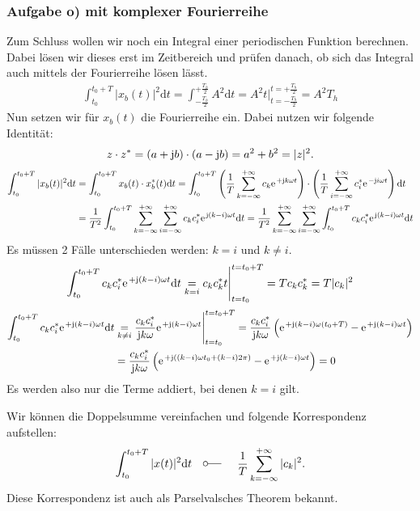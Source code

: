 \documentclass[11pt,a4paper,DIV=12]{scrartcl}
\newcommand{\diff}{\mathrm{d}}
\begin{document}
\subsubsection*{Aufgabe o) mit komplexer Fourierreihe}
%
Zum Schluss wollen wir noch ein Integral einer periodischen Funktion berechnen.
%
Dabei lösen wir dieses erst im Zeitbereich und prüfen danach, ob sich das
Integral auch mittels der Fourierreihe lösen lässt.
%
\begin{align}
	\int_{t_0}^{t_0+T}|x_b(t)|^2\diff t
	=\int_{-\frac{T_h}{2}}^{+\frac{T_h}{2}}A^2\diff t
	= A^2t\Bigg |_{t=-\frac{T_h}{2}}^{t=+\frac{T_h}{2}}=A^2T_h
\end{align}
%
Nun setzen wir für $x_b(t)$ die Fourierreihe ein.
%
Dabei nutzen wir folgende Identität:
%
\begin{align}
	z\cdot z^*=(a+\im b)\cdot (a-\im b)=a^2+b^2=|z|^2.
\end{align}
%
%
\begin{align}
	\int_{t_0}^{t_0+T}|x_b(t)|^2\diff t
	&=\int_{t_0}^{t_0+T}x_b(t)\cdot x_b^*(t)\diff t
	=\int_{t_0}^{t_0+T}\left (\frac{1}{T}\sum_{k=-\infty}^{+\infty}c_k\e^{+\im k \omega t}\right )\cdot \left (\frac{1}{T}\sum_{i=-\infty}^{+\infty}c_i^*\e^{-\im i \omega t}\right )\diff t\nonumber \\
	&=\frac{1}{T^2}\int_{t_0}^{t_0+T}\sum_{k=-\infty}^{+\infty}\sum_{i=-\infty}^{+\infty}c_kc_i^*\e^{\im (k-i)\omega t}\diff t =\frac{1}{T^2}\sum_{k=-\infty}^{+\infty}\sum_{i=-\infty}^{+\infty}\int_{t_0}^{t_0+T}c_kc_i^*\e^{\im (k-i)\omega t}\diff t
\end{align}
%
Es müssen 2 Fälle unterschieden werden: $k=i$ und $k\neq i$.
%
\begin{align}
	\int_{t_0}^{t_0+T}c_kc_i^*\e^{+\im (k-i)\omega t}\diff t \underset{k=i}{=}c_kc_k^*t\Bigg |_{t=t_0}^{t=t_0+T}=Tc_kc_k^*=T|c_k|^2
\end{align}
%
\begin{align}
	\int_{t_0}^{t_0+T}c_kc_i^*\e^{+\im (k-i)\omega t}\diff t
	&\underset{k\neq i}{=}\frac{c_kc_i^*}{\im k \omega }\e^{+\im (k-i)\omega t}\Bigg |_{t=t_0}^{t=t_0+T}
	=\frac{c_kc_i^*}{\im k \omega }\left (\e^{+\im (k-i)\omega (t_0+T)}-\e^{+\im (k-i)\omega t}\right )\nonumber \\
	&=\frac{c_kc_i^*}{\im k \omega }\left (\e^{+\im ((k-i)\omega t_0+(k-i)2\pi)}-\e^{+\im (k-i)\omega t}\right )=0
\end{align}
Es werden also nur die Terme addiert, bei denen $k=i$ gilt.
%

Wir können die Doppelsumme vereinfachen und folgende Korrespondenz aufstellen:
%
\begin{align}
	\int_{t_0}^{t_0+T}|x(t)|^2\diff t
	\quad\fourier\quad\frac{1}{T}\sum_{k=-\infty}^{+\infty}|c_k|^2.
\end{align}
Diese Korrespondenz ist auch als Parselvalsches Theorem bekannt.




\renewcommand{\refname}{Buchzitate}
\clearpage

\end{document}
